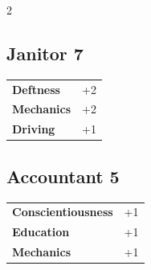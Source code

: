 \begin{multicols}{2}
\begin{tcolorbox}

\end{tcolorbox}

\begin{tcolorbox}
    \subsection*{Janitor \hfill \small{7 }}
    \tcblower




\begin{tabular}{@{}ll@{}}
    \textbf{Deftness} & +2\\
    \textbf{Mechanics} & +2\\
    \textbf{Driving} & +1\\
\end{tabular}


\end{tcolorbox}

\begin{tcolorbox}
    \subsection*{Accountant \hfill \small{5 }}
    \tcblower




\begin{tabular}{@{}ll@{}}
    \textbf{Conscientiousness} & +1\\
    \textbf{Education} & +1\\
    \textbf{Mechanics} & +1\\
\end{tabular}



\end{tcolorbox}
\end{multicols}

